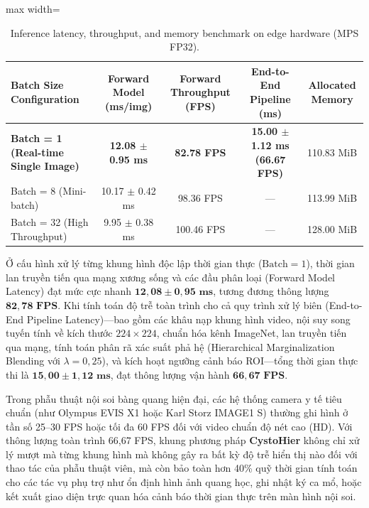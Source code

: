 \documentclass[runningheads]{llncs}
\begin{document}
\begin{table}[H]
\centering
\caption{Inference latency, throughput, and memory benchmark on edge hardware (MPS FP32).}
\label{tab:inference_latency}
\begin{adjustbox}{max width=\textwidth}
\begin{tabular}{lcccc}
\toprule
\textbf{Batch Size Configuration} & \textbf{Forward Model (ms/img)} & \textbf{Forward Throughput (FPS)} & \textbf{End-to-End Pipeline (ms)} & \textbf{Allocated Memory} \\
\midrule
\textbf{Batch = 1 (Real-time Single Image)} & \textbf{12.08 $\pm$ 0.95 ms} & \textbf{82.78 FPS} & \textbf{15.00 $\pm$ 1.12 ms (66.67 FPS)} & 110.83 MiB \\
Batch = 8 (Mini-batch) & 10.17 $\pm$ 0.42 ms & 98.36 FPS & --- & 113.99 MiB \\
Batch = 32 (High Throughput) & 9.95 $\pm$ 0.38 ms & 100.46 FPS & --- & 128.00 MiB \\
\bottomrule
\end{tabular}
\end{adjustbox}
\end{table}

Ở cấu hình xử lý từng khung hình độc lập thời gian thực ($\text{Batch} = 1$), thời gian lan truyền tiến qua mạng xương sống và các đầu phân loại (Forward Model Latency) đạt mức cực nhanh $\mathbf{12{,}08 \pm 0{,}95\text{ ms}}$, tương đương thông lượng $\mathbf{82{,}78\text{ FPS}}$. Khi tính toán độ trễ toàn trình cho cả quy trình xử lý biên (End-to-End Pipeline Latency)---bao gồm các khâu nạp khung hình video, nội suy song tuyến tính về kích thước $224 \times 224$, chuẩn hóa kênh ImageNet, lan truyền tiến qua mạng, tính toán phân rã xác suất phả hệ (Hierarchical Marginalization Blending với $\lambda=0{,}25$), và kích hoạt ngưỡng cảnh báo ROI---tổng thời gian thực thi là $\mathbf{15{,}00 \pm 1{,}12\text{ ms}}$, đạt thông lượng vận hành $\mathbf{66{,}67\text{ FPS}}$.

Trong phẫu thuật nội soi bàng quang hiện đại, các hệ thống camera y tế tiêu chuẩn (như Olympus EVIS X1 hoặc Karl Storz IMAGE1 S) thường ghi hình ở tần số 25--30 FPS hoặc tối đa 60 FPS đối với video chuẩn độ nét cao (HD). Với thông lượng toàn trình 66,67 FPS, khung phương pháp \textbf{CystoHier} không chỉ xử lý mượt mà từng khung hình mà không gây ra bất kỳ độ trễ hiển thị nào đối với thao tác của phẫu thuật viên, mà còn bảo toàn hơn 40\% quỹ thời gian tính toán cho các tác vụ phụ trợ như ổn định hình ảnh quang học, ghi nhật ký ca mổ, hoặc kết xuất giao diện trực quan hóa cảnh báo thời gian thực trên màn hình nội soi.
\end{document}
